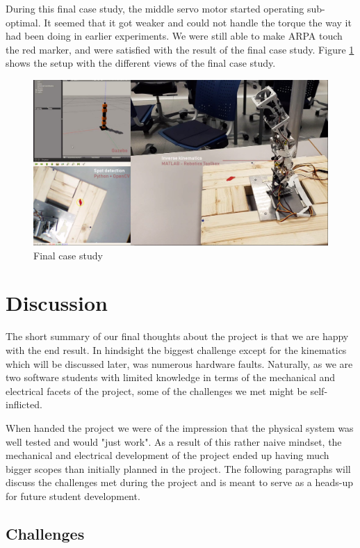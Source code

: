 \documentclass[11pt,a4paper, titlepage]{article}
\begin{document}
During this final case study, the middle servo motor started operating sub-optimal. It seemed that it got weaker and could not handle the torque the way it had been doing in earlier experiments. We were still able to make ARPA touch the red marker, and were satisfied with the result of the final case study. Figure \ref{fig:three-split} shows the setup with the different views of the final case study.
	\begin{figure}[H]
		\centering
		\includegraphics[width=\linewidth]{../Diagrams/ThreeSplit.png}
		\caption{Final case study}
		\label{fig:three-split}
	\end{figure}
	
\newpage
	\section{Discussion}
	\label{discussion}
	The short summary of our final thoughts about the project is that we are happy with the end result. In hindsight the biggest challenge except for the kinematics which will be discussed later, was numerous hardware faults. Naturally, as we are two software students with limited knowledge in terms of the mechanical and electrical facets of the project, some of the challenges we met might be self-inflicted.
	
When handed the project we were of the impression that the physical system was well tested and would "just work". As a result of this rather naive mindset, the mechanical and electrical development of the project ended up having much bigger scopes than initially planned in the project. The following paragraphs will discuss the challenges met during the project and is meant to serve as a heads-up for future student development.

\subsection{Challenges}
\end{document}
